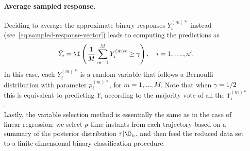   \paragraph{Average sampled response.} Deciding to average the approximate binary responses \(Y_i^{(m)*}\) instead (see~\eqref{eq:sampled-response-vector}) leads to computing the predictions as
  \[
    \hat Y_i = \I\left(\frac{1}{M} \sum_{m=1}^M Y_i^{(m)*} \geq \gamma\right), \quad i=1,\dots,n'.
  \]
  In this case, each \(Y_i^{(m)*}\) is a random variable that follows a Bernoulli distribution with parameter \(p_i^{(m)*}\), for \(m=1,\dots,M\). Note that when \(\gamma=1/2\) this is equivalent to predicting \(Y_i\) according to the majority vote of all the \(Y_i^{(m)*}\).\\

Lastly, the variable selection method is essentially the same as in the case of linear regression: we select \(p\) time instants from each trajectory based on a summary of the posterior distribution \(\tau | \D_n\), and then feed the reduced data set to a finite-dimensional binary classification procedure.
